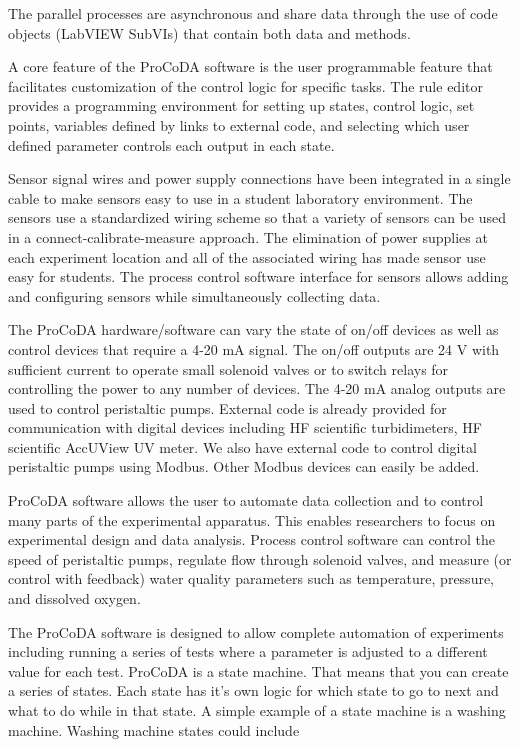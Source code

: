 \documentclass[letterpaper,10pt,english]{sphinxmanual}
\begin{document}
The parallel processes are asynchronous and share data through the use of code objects (LabVIEW SubVIs) that contain both data and methods.

A core feature of the ProCoDA software is the user programmable feature that facilitates customization of the control logic for specific tasks. The rule editor provides a programming environment for setting up states, control logic, set points, variables defined by links to external code, and selecting which user defined parameter controls each output in each state.

Sensor signal wires and power supply connections have been integrated in a single cable to make sensors easy to use in a student laboratory environment. The sensors use a standardized wiring scheme so that a variety of sensors can be used in a connect-calibrate-measure approach. The elimination of power supplies at each experiment location and all of the associated wiring has made sensor use easy for students. The process control software interface for sensors allows adding and configuring sensors while simultaneously collecting data.

The ProCoDA hardware/software can vary the state of on/off devices as well as control devices that require a 4-20 mA signal. The on/off outputs are 24 V with sufficient current to operate small solenoid valves or to switch relays for controlling the power to any number of devices. The 4-20 mA analog outputs are used to control peristaltic pumps. External code is already provided for communication with digital devices including HF scientific turbidimeters, HF scientific AccUView UV meter. We also have external code to control digital peristaltic pumps using Modbus. Other Modbus devices can easily be added.

ProCoDA software allows the user to automate data collection and to control many parts of the experimental apparatus. This enables researchers to focus on experimental design and data analysis. Process control software can control the speed of peristaltic pumps, regulate flow through solenoid valves, and measure (or control with feedback) water quality parameters such as temperature, pressure, and dissolved oxygen.

The ProCoDA software is designed to allow complete automation of experiments including running a series of tests where a parameter is adjusted to a different value for each test. ProCoDA is a state machine. That means that you can create a series of states. Each state has it’s own logic for which state to go to next and what to do while in that state. A simple example of a state machine is a washing machine. Washing machine states could include
\end{document}
